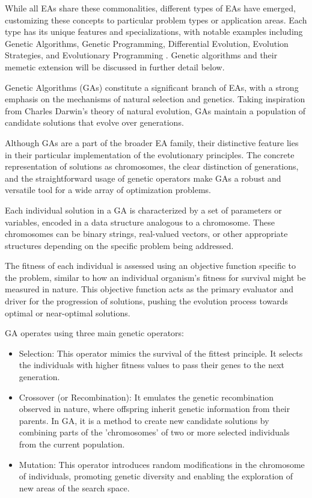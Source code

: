 \documentclass[twoside]{ctuthesis}
\theoremstyle{plain}
\theoremstyle{definition}
\theoremstyle{note}
\begin{document}
While all EAs share these commonalities, different types of EAs have emerged, customizing these concepts to particular problem types or application areas. Each type has its unique features and specializations, with notable examples including Genetic Algorithms, Genetic Programming, Differential Evolution, Evolution Strategies, and Evolutionary Programming \cite{marte2018handbook}. Genetic algorithms and their memetic extension will be discussed in further detail below.

Genetic Algorithms (GAs) constitute a significant branch of EAs, with a strong emphasis on the mechanisms of natural selection and genetics. Taking inspiration from Charles Darwin's theory of natural evolution, GAs maintain a population of candidate solutions that evolve over generations.

Although GAs are a part of the broader EA family, their distinctive feature lies in their particular implementation of the evolutionary principles. The concrete representation of solutions as chromosomes, the clear distinction of generations, and the straightforward usage of genetic operators make GAs a robust and versatile tool for a wide array of optimization problems.

Each individual solution in a GA is characterized by a set of parameters or variables, encoded in a data structure analogous to a chromosome. These chromosomes can be binary strings, real-valued vectors, or other appropriate structures depending on the specific problem being addressed.

The fitness of each individual is assessed using an objective function specific to the problem, similar to how an individual organism's fitness for survival might be measured in nature. This objective function acts as the primary evaluator and driver for the progression of solutions, pushing the evolution process towards optimal or near-optimal solutions.

GA operates using three main genetic operators:
\begin{itemize}
	\item Selection: This operator mimics the survival of the fittest principle. It selects the individuals with higher fitness values to pass their genes to the next generation.
	\item Crossover (or Recombination): It emulates the genetic recombination observed in nature, where offspring inherit genetic information from their parents. In GA, it is a method to create new candidate solutions by combining parts of the 'chromosomes' of two or more selected individuals from the current population.
	\item Mutation: This operator introduces random modifications in the chromosome of individuals, promoting genetic diversity and enabling the exploration of new areas of the search space.
\end{itemize}
\end{document}

